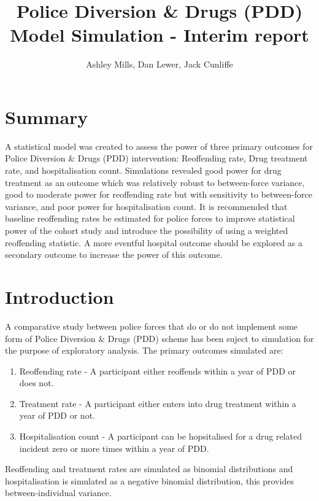 \documentclass[
]{article}
\title{Police Diversion \& Drugs (PDD) Model Simulation - Interim report}
\subtitle{Ashley Mills, Dan Lewer, Jack Cunliffe}
\author{}
\date{\vspace{-2.5em}}
\providecommand{\tightlist}{%
  \setlength{\itemsep}{0pt}\setlength{\parskip}{0pt}}
\begin{document}
\maketitle

{
\setcounter{tocdepth}{2}
\tableofcontents
}
\hypertarget{summary}{%
\section{Summary}\label{summary}}

A statistical model was created to assess the power of three primary outcomes for Police Diversion \& Drugs (PDD) intervention: Reoffending rate, Drug treatment rate, and hospitalisation count. Simulations revealed good power for drug treatment as an outcome which was relatively robust to between-force variance, good to moderate power for reoffending rate but with sensitivity to between-force variance, and poor power for hospitalisation count. It is recommended that baseline reoffending rates be estimated for police forces to improve statistical power of the cohort study and introduce the possibility of using a weighted reoffending statistic. A more eventful hospital outcome should be explored as a secondary outcome to increase the power of this outcome.

\hypertarget{introduction}{%
\section{Introduction}\label{introduction}}

A comparative study between police forces that do or do not implement some form of Police Diversion \& Drugs (PDD) scheme has been suject to simulation for the purpose of exploratory analysis. The primary outcomes simulated are:

\begin{enumerate}
\def\labelenumi{\arabic{enumi}.}
\tightlist
\item
  Reoffending rate - A participant either reoffends within a year of PDD or does not.
\item
  Treatment rate - A participant either enters into drug treatment within a year of PDD or not.
\item
  Hospitalisation count - A participant can be hopsitalised for a drug related incident zero or more times within a year of PDD.
\end{enumerate}

Reoffending and treatment rates are simulated as binomial distributions and hospitalisation is simulated as a negative binomial distribution, this provides between-individual variance.
\end{document}
